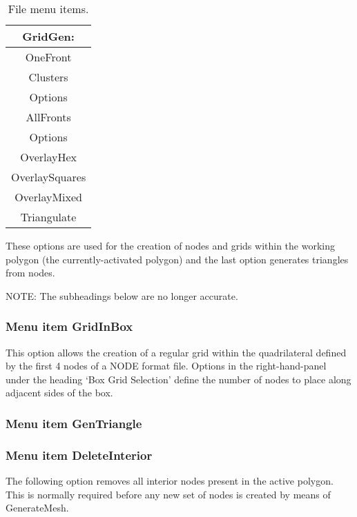 \documentclass{article}
\begin{document}
\begin{table}[htb!]
 \caption{File menu items.}
  \begin{center}
   \begin{tabular}{|c|}
    \hline
GridGen:\\     \hline
OneFront \\     \hline
Clusters \\ Options \\     \hline
AllFronts \\ Options \\     \hline
OverlayHex \\ OverlaySquares \\ OverlayMixed \\     \hline
Triangulate \\
    \hline
   \end{tabular}
   \label{tab:GRIDGEN}
  \end{center}
\end{table}


These options are used for the creation of nodes and grids within the working polygon (the currently-activated polygon) and the last option generates triangles from nodes.

NOTE: The subheadings below are no longer accurate.

\subsubsection[Menu item GridInBox]{Menu item GridInBox}
This option allows the creation of a regular grid within the quadrilateral defined by the first 4 nodes of a NODE format file. Options in the right-hand-panel under the heading `Box Grid Selection' define the number of nodes to place along adjacent sides of the box.

\subsubsection[Menu item GenTriangle]{Menu item GenTriangle}

\bigskip

\subsubsection[Menu item DeleteInterior]{Menu item DeleteInterior}
The following option removes all interior nodes present in the active polygon. This is normally required before any new set of nodes is created by means of GenerateMesh.
\end{document}
